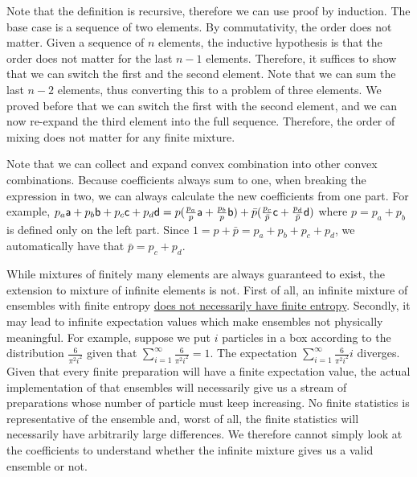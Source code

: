 \begin{mathSection}
\begin{check}
	Note that the definition is recursive, therefore we can use proof by induction. The base case is a sequence of two elements. By commutativity, the order does not matter. Given a sequence of $n$ elements, the inductive hypothesis is that the order does not matter for the last $n-1$ elements. Therefore, it suffices to show that we can switch the first and the second element. Note that we can sum the last $n-2$ elements, thus converting this to a problem of three elements. We proved before that we can switch the first with the second element, and we can now re-expand the third element into the full sequence. Therefore, the order of mixing does not matter for any finite mixture. 
\end{check}

\begin{remark}
	Note that we can collect and expand convex combination into other convex combinations. Because coefficients always sum to one, when breaking the expression in two, we can always calculate the new coefficients from one part. For example, $p_a \ens[a] + p_b \ens[b] + p_c \ens[c] + p_d \ens[d] = p(\frac{p_a}{p} \ens[a] + \frac{p_b}{p} \ens[b]) + \bar{p}(\frac{p_c}{\bar{p}} \ens[c] + \frac{p_d}{\bar{p}} \ens[d])$ where $p = p_a + p_b$ is defined only on the left part. Since $1 = p + \bar{p} = p_a +p_b + p_c + p_d$, we automatically have that $\bar{p} = p_c + p_d$.
\end{remark}
\end{mathSection}

While mixtures of finitely many elements are always guaranteed to exist, the extension to mixture of infinite elements is not. First of all, an infinite mixture of ensembles with finite entropy \href{https://arxiv.org/pdf/1212.5630}{does not necessarily have finite entropy}. Secondly, it may lead to infinite expectation values which make ensembles not physically meaningful. For example, suppose we put $i$ particles in a box according to the distribution $\frac{6}{\pi^2 i^2}$ given that $\sum_{i=1}^{\infty} \frac{6}{\pi^2 i^2}=1$. The expectation $\sum_{i=1}^{\infty} \frac{6}{\pi^2 i^2} i$ diverges. Given that every finite preparation will have a finite expectation value, the actual implementation of that ensembles will necessarily give us a stream of preparations whose number of particle must keep increasing. No finite statistics is representative of the ensemble and, worst of all, the finite statistics will necessarily have arbitrarily large differences. We therefore cannot simply look at the coefficients to understand whether the infinite mixture gives us a valid ensemble or not.

